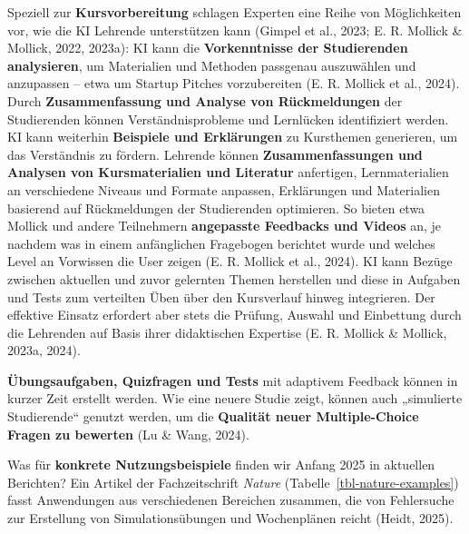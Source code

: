 \documentclass[
  ngerman,
  letterpaper,
  DIV=11]{scrreprt}
\begin{document}
Speziell zur \textbf{Kursvorbereitung} schlagen Experten eine Reihe von
Möglichkeiten vor, wie die KI Lehrende unterstützen kann (Gimpel et al.,
2023; E. R. Mollick \& Mollick, 2022, 2023a): KI kann die
\textbf{Vorkenntnisse der Studierenden analysieren}, um Materialien und
Methoden passgenau auszuwählen und anzupassen -- etwa um Startup Pitches
vorzubereiten (E. R. Mollick et al., 2024). Durch
\textbf{Zusammenfassung und Analyse von Rückmeldungen} der Studierenden
können Verständnisprobleme und Lernlücken identifiziert werden. KI kann
weiterhin \textbf{Beispiele und Erklärungen} zu Kursthemen generieren,
um das Verständnis zu fördern. Lehrende können \textbf{Zusammenfassungen
und Analysen von Kursmaterialien und Literatur} anfertigen,
Lernmaterialien an verschiedene Niveaus und Formate anpassen,
Erklärungen und Materialien basierend auf Rückmeldungen der Studierenden
optimieren. So bieten etwa Mollick und andere Teilnehmern
\textbf{angepasste Feedbacks und Videos} an, je nachdem was in einem
anfänglichen Fragebogen berichtet wurde und welches Level an Vorwissen
die User zeigen (E. R. Mollick et al., 2024). KI kann Bezüge zwischen
aktuellen und zuvor gelernten Themen herstellen und diese in Aufgaben
und Tests zum verteilten Üben über den Kursverlauf hinweg integrieren.
Der effektive Einsatz erfordert aber stets die Prüfung, Auswahl und
Einbettung durch die Lehrenden auf Basis ihrer didaktischen Expertise
(E. R. Mollick \& Mollick, 2023a, 2024).

\textbf{Übungsaufgaben, Quizfragen und Tests} mit adaptivem Feedback
können in kurzer Zeit erstellt werden. Wie eine neuere Studie zeigt,
können auch „simulierte Studierende`` genutzt werden, um die
\textbf{Qualität neuer Multiple-Choice Fragen zu bewerten} (Lu \& Wang,
2024).

Was für \textbf{konkrete Nutzungsbeispiele} finden wir Anfang 2025 in
aktuellen Berichten? Ein Artikel der Fachzeitschrift \emph{Nature}
(Tabelle~\ref{tbl-nature-examples}) fasst Anwendungen aus verschiedenen
Bereichen zusammen, die von Fehlersuche zur Erstellung von
Simulationsübungen und Wochenplänen reicht (Heidt, 2025).
\end{document}

